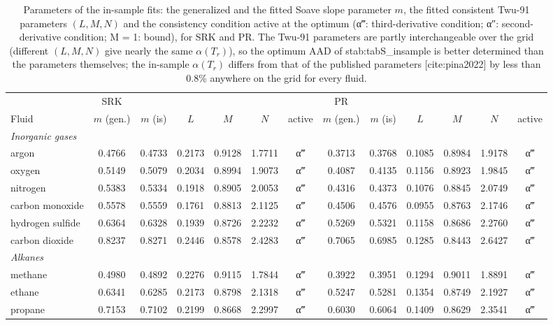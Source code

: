 \begin{table}[H]
\centering
\caption{Parameters of the in-sample fits: the generalized and the fitted Soave slope parameter $m$, the fitted consistent Twu-91 parameters $(L, M, N)$ and the consistency condition active at the optimum (α‴: third-derivative condition; α″: second-derivative condition; M = 1: bound), for SRK and PR. The Twu-91 parameters are partly interchangeable over the grid (different $(L, M, N)$ give nearly the same $\alpha(T_r)$), so the optimum AAD of {stab:tabS_insample} is better determined than the parameters themselves; the in-sample $\alpha(T_r)$ differs from that of the published parameters [cite:pina2022] by less than 0.8\% anywhere on the grid for every fluid.}
\label{tab:tabS_insample_params}
\small
\begin{tabular}{lcccccccccccc}
\toprule
 & SRK &  &  &  &  &  & PR &  &  &  &  &  \\
Fluid & $m$ (gen.) & $m$ (is) & $L$ & $M$ & $N$ & active & $m$ (gen.) & $m$ (is) & $L$ & $M$ & $N$ & active \\
\midrule
\multicolumn{13}{l}{\emph{Inorganic gases}} \\
argon & 0.4766 & 0.4733 & 0.2173 & 0.9128 & 1.7711 & α‴ & 0.3713 & 0.3768 & 0.1085 & 0.8984 & 1.9178 & α‴ \\
oxygen & 0.5149 & 0.5079 & 0.2034 & 0.8994 & 1.9073 & α‴ & 0.4087 & 0.4135 & 0.1156 & 0.8923 & 1.9845 & α‴ \\
nitrogen & 0.5383 & 0.5334 & 0.1918 & 0.8905 & 2.0053 & α‴ & 0.4316 & 0.4373 & 0.1076 & 0.8845 & 2.0749 & α‴ \\
carbon monoxide & 0.5578 & 0.5559 & 0.1761 & 0.8813 & 2.1125 & α‴ & 0.4506 & 0.4576 & 0.0955 & 0.8763 & 2.1746 & α‴ \\
hydrogen sulfide & 0.6364 & 0.6328 & 0.1939 & 0.8726 & 2.2232 & α‴ & 0.5269 & 0.5321 & 0.1158 & 0.8686 & 2.2760 & α‴ \\
carbon dioxide & 0.8237 & 0.8271 & 0.2446 & 0.8578 & 2.4283 & α‴ & 0.7065 & 0.6985 & 0.1285 & 0.8443 & 2.6427 & α‴ \\
\multicolumn{13}{l}{\emph{Alkanes}} \\
methane & 0.4980 & 0.4892 & 0.2276 & 0.9115 & 1.7844 & α‴ & 0.3922 & 0.3951 & 0.1294 & 0.9011 & 1.8891 & α‴ \\
ethane & 0.6341 & 0.6285 & 0.2173 & 0.8798 & 2.1318 & α‴ & 0.5247 & 0.5281 & 0.1354 & 0.8749 & 2.1927 & α‴ \\
propane & 0.7153 & 0.7102 & 0.2199 & 0.8668 & 2.2997 & α‴ & 0.6030 & 0.6064 & 0.1409 & 0.8629 & 2.3541 & α‴ \\

\end{tabular}
\end{table}
